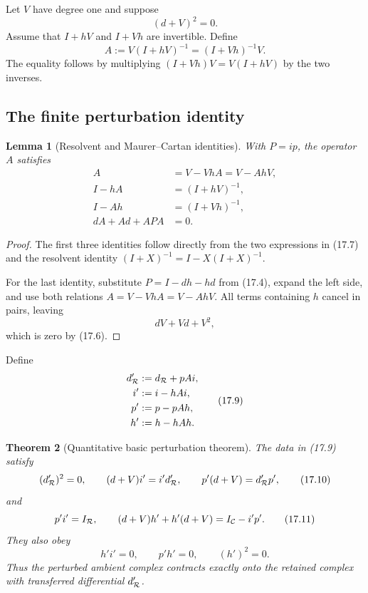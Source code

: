 \documentclass[11pt]{article}
\newtheorem{theorem}{Theorem}[section]
\newtheorem{lemma}[theorem]{Lemma}
\theoremstyle{remark}
\begin{document}
Let \(V\) have degree one and suppose
\[
                         (d+V)^2=0.                         \tag{17.6}
\]
Assume that \(I+hV\) and \(I+Vh\) are invertible.  Define
\[
 A:=V(I+hV)^{-1}=(I+Vh)^{-1}V.                             \tag{17.7}
\]
The equality follows by multiplying
\((I+Vh)V=V(I+hV)\) by the two inverses.

\subsection{The finite perturbation identity}

\begin{lemma}[Resolvent and Maurer--Cartan identities]
\label{lem:v12v17-algebra}
With \(P=ip\), the operator \(A\) satisfies
\[
\begin{split}
 A&=V-VhA=V-AhV,\\
 I-hA&=(I+hV)^{-1},\\
 I-Ah&=(I+Vh)^{-1},\\
 dA+Ad+APA&=0.
\end{split}                                                  \tag{17.8}
\]
\end{lemma}

\begin{proof}
The first three identities follow directly from the two expressions
in (17.7) and the resolvent identity
\((I+X)^{-1}=I-X(I+X)^{-1}\).

For the last identity, substitute
\(P=I-dh-hd\) from (17.4), expand the left side, and use both
relations \(A=V-VhA=V-AhV\).  All terms containing \(h\) cancel in
pairs, leaving
\[
                         dV+Vd+V^2,
\]
which is zero by (17.6).
\end{proof}

Define
\[
\begin{split}
 d_{\cal R}'&:=d_{\cal R}+pAi,\\
 i'&:=i-hAi,\\
 p'&:=p-pAh,\\
 h'&:=h-hAh.
\end{split}                                                  \tag{17.9}
\]

\begin{theorem}[Quantitative basic perturbation theorem]
\label{thm:v12v17-transfer}
The data in (17.9) satisfy
\[
 (d_{\cal R}')^2=0,\qquad
 (d+V)i'=i'd_{\cal R}',\qquad
 p'(d+V)=d_{\cal R}'p',                                    \tag{17.10}
\]
and
\[
 p'i'=I_{\cal R},\qquad
 (d+V)h'+h'(d+V)=I_{\cal C}-i'p'.                          \tag{17.11}
\]
They also obey
\[
 h'i'=0,\qquad p'h'=0,\qquad (h')^2=0.                     \tag{17.12}
\]
Thus the perturbed ambient complex contracts exactly onto the
retained complex with transferred differential \(d_{\cal R}'\).
\end{theorem}
\end{document}
